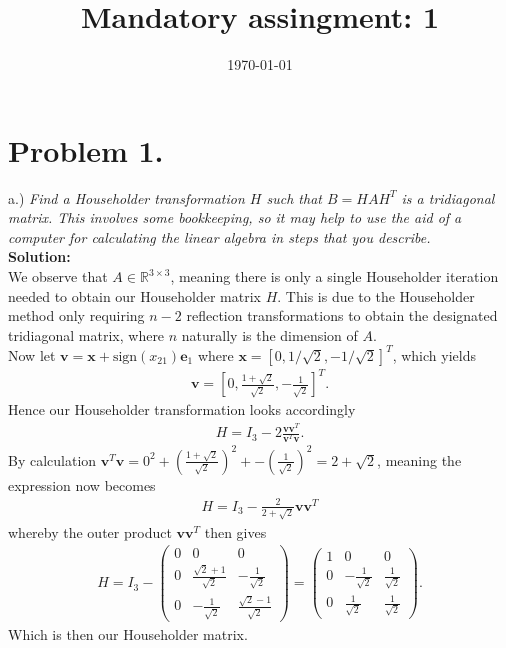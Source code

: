 \documentclass[12pt,
               a4paper,
               article,
               oneside,
               english,oldfontcommands]{memoir}
\date{\today}
\title{Mandatory assingment: 1}
\newcommand{\R}{\mathbb{R}}
\newcommand{\spaze}{\vspace{4mm}\\}
\begin{document}
\header{}
\section*{\centering Problem 1.}
a.) \emph{Find a Householder transformation $H$ such that $B = HAH^T$ is a tridiagonal matrix. This involves some bookkeeping, so it may help to use the aid of a computer for calculating the linear algebra in steps that you describe.} \spaze
\textbf{Solution:} \spaze 
We observe that $A \in \R^{3 \times 3}$, meaning there is only a single Householder iteration needed to obtain our Householder matrix $H$. This is due to the Householder method only requiring $n-2$ reflection transformations to obtain the designated tridiagonal matrix, where $n$ naturally is the dimension of $A$. \vspace{2mm}\\ 
Now let $\bm{v} = \bm{x} + \text{sign}({x_{21}} )\bm{e}_1$ where $\bm{x} = [0, 1 / \sqrt{2},-1 / \sqrt{2}]^T$, which yields 
\begin{align*}
\bm{v} = \left[0, \frac{1 + \sqrt{2}}{\sqrt{2}},  -\frac{1}{\sqrt{2}} \right]^T.
\end{align*}
Hence our Householder transformation looks accordingly 
\begin{align*}
H = I_{3} - 2 \frac{\bm{v} \bm{v}^T}{\bm{v}^T \bm{v}}.
\end{align*}
By calculation $\bm{v}^T \bm{v} = 0^2 + (\frac{1 + \sqrt{2}}{\sqrt{2}})^2 + -(\frac{1}{\sqrt{2}})^2 = 2 + \sqrt{2}$, meaning the expression now becomes 
\begin{align*}
H = I_{3} - \frac{2}{2 + \sqrt{2}} \bm{v} \bm{v}^T 
\end{align*}
whereby the outer product $\bm{v} \bm{v}^T$ then gives 
\begin{align*}
H =  I_{3} - \begin{pmatrix}
0 &0 & 0 \\[5pt]
0 & \frac{\sqrt{2} + 1}{\sqrt{2}} & -\frac{1}{\sqrt{2}} \\[5pt]
0 & -\frac{1}{\sqrt{2}} & \frac{\sqrt{2} -1}{\sqrt{2}} 
\end{pmatrix} = 
\begin{pmatrix}
1 & 0 & 0 \\[5pt]
0 & -\frac{1}{\sqrt{2}} & \frac{1}{\sqrt{2}} \\[5pt]
0 & \frac{1}{\sqrt{2}} & \frac{1}{\sqrt{2}}
\end{pmatrix}.
\end{align*}
Which is then our Householder matrix. \vspace{2mm}\\
\end{document}
